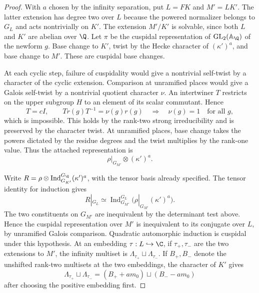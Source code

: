 \begin{proof}
With \(a\) chosen by the infinity separation, put
\(L=FK\) and \(M'=LK'\). The latter extension has degree
two over \(L\) because the powered normalizer belongs
to \(G_L\) and acts nontrivially on \(K'\). The extension
\(M'/K'\) is solvable, since both \(L\) and \(K'\) are
abelian over \(\Q\). Let \(\pi\) be the cuspidal representation
of \(\mathrm{GL}_2(\mathbb A_\Q)\) of the newform \(g\).
Base change to \(K'\), twist by the Hecke character of
\((\kappa')^a\), and base change to \(M'\). These are
cuspidal base changes.

At each cyclic step, failure of
cuspidality would give a nontrivial self-twist by a character
of the cyclic extension. Comparison at unramified places would give a Galois self-twist by a nontrivial quotient character \(\nu\). An intertwiner \(T\) restricts on the upper subgroup \(H\) to an element of its scalar commutant. Hence
\[
 T=cI,\qquad T r(g)T^{-1}=\nu(g)r(g)
 \quad\Longrightarrow\quad \nu(g)=1\quad\text{for all }g,
\]
which is impossible. This holds by the rank-two strong irreducibility
and is preserved by the character twist. At unramified places, base change takes the powers
dictated by the residue degrees and the twist multiplies
by the rank-one value. Thus the attached representation is
\[
                 \rho|_{G_{M'}}\otimes(\kappa')^a .
\]
\cite{clozel-rajan}\label{cor:ordinary-count-iii-admission-1}

Write \(R=\rho\otimes\operatorname{Ind}_{G_{K'}}^{G_\Q}
(\kappa')^a\), with the tensor basis already specified.
The tensor identity for induction gives
\[
  R|_{G_L}
   \simeq\operatorname{Ind}_{G_{M'}}^{G_L}
                 \bigl(\rho|_{G_{M'}}(\kappa')^a\bigr).
\]
The two constituents on \(G_{M'}\) are inequivalent by
the determinant test above. Hence the cuspidal representation
over \(M'\) is inequivalent to its conjugate over \(L\),
by unramified Galois comparison. Quadratic automorphic
induction is cuspidal under this hypothesis. At an embedding \(\tau:L\hookrightarrow\C\), if \(\tau_+,\tau_-\)
are the two extensions to \(M'\), the infinity multiset is
\(\Lambda_{\tau_+}\sqcup\Lambda_{\tau_-}\). If \(B_+,B_-\) denote the unshifted rank-two multisets at the two embeddings, the character of \(K'\) gives
\[
 \Lambda_{\tau_+}\sqcup\Lambda_{\tau_-}
 =(B_++am_0)\sqcup(B_--am_0)
\]
after choosing the positive embedding first.


\end{proof}
